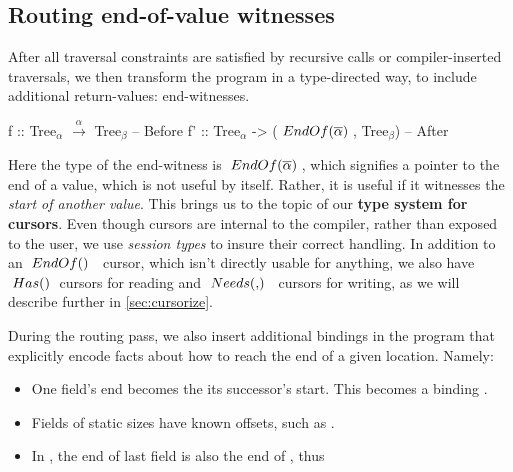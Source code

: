 \documentclass[a4paper,english]{lipics-v2016}
\newcommand{\travarr}[1]{\xrightarrow{#1}}
\newcommand{\fresh}[1]{\ensuremath{#1}}
\newcommand{\freshA}{\fresh{\alpha}}
\newcommand{\freshB}{\fresh{\beta}}
\newcommand{\locend}[1]{\ensuremath{\overline{#1}}}
\begin{document}
\subsection{Routing end-of-value witnesses}

After all traversal constraints are satisfied by recursive calls or
compiler-inserted traversals, we then transform the program in a type-directed
way, to include additional return-values: end-witnesses.

\begin{code}
  f  :: Tree$_\freshA$ $\travarr{\freshA}$ Tree$_\freshB$                  -- Before
  f' :: Tree$_\freshA$ -> ($\ENDOF{\locend{\freshA}}$, Tree$_\freshB$) -- After
\end{code}


Here the type of the end-witness is $\ENDOF{\locend{\freshA}}$, which signifies
a pointer to the end of a value, which is not useful by itself.  Rather, it is
useful if it witnesses the {\em start of another value}.
%
This brings us to the topic of our {\bf type system for cursors}.  Even though
cursors are internal to the compiler, rather than exposed to the user, we use 
{\em session types} to insure their correct handling.  In addition to an
$\ENDOF$ cursor, which isn't directly usable for anything, we also have
$\; Has() \;$ cursors for reading and $\NEEDS{}$ cursors for writing, as we will
describe further in \cref{sec:cursorize}.

During the routing pass, we also insert additional bindings in the program that
explicitly encode facts about how to reach the end of a given location.  Namely:

\begin{itemize}
\item One field's end becomes the its successor's start.  This becomes a
  binding .
\item Fields of static sizes have known offsets, such as .  
\item In , the end of last field  is
  also the end of , thus \\ 
\end{itemize}
\end{document}
